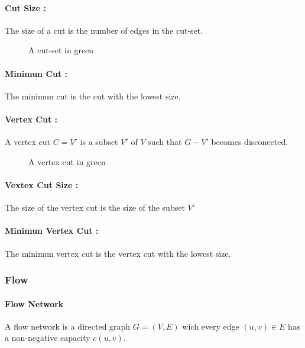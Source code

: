 \paragraph{Cut Size :}
The size of a cut is the number of edges in the cut-set.


\begin{figure}[!h]
  \begin{center}
    
  \end{center}
  \caption{A cut-set in green}
\end{figure}

\paragraph{Minimun Cut :} 
The minimun cut is the cut with the lowest size. 

\paragraph{Vertex Cut :}
A vertex cut $C=V'$ is a subset $V'$ of $V$ such that $G-V'$ becomes disconected.

\begin{figure}[!h]
  \begin{center}
    
  \end{center}
  \caption{A vertex cut in green}
\end{figure}


\paragraph{Vextex Cut Size :}
The size of the  vertex cut is the size of the subset $V'$

\paragraph{Minimun Vertex Cut :}
The minimun vertex cut is the vertex cut with the lowest size.

\subsubsection{Flow}
\paragraph{Flow Network}
A flow network is a directed graph $G=(V,E)$ wich every edge $(u,v) \in E$ has a non-negative capacity $c(u,v)$.

